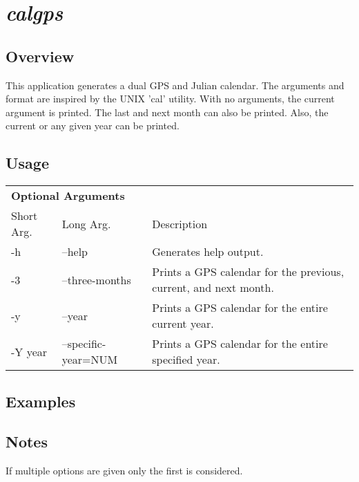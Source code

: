%
%

\section{\emph{calgps}}
\subsection{Overview}
This application generates a dual GPS and Julian calendar. The arguments and 
format are inspired by the UNIX 'cal' utility. With no arguments, the current 
argument is printed. The last and next month can also be printed. Also, the 
current or any given year can be printed.
\subsection{Usage}
\begin{\outputsize}
\begin{longtable}{lll}
\multicolumn{3}{l}{\textbf{Optional Arguments}} \\
Short Arg. & Long Arg. & Description \\
-h & --help & Generates help output. \\ 
-3 & --three-months & Prints a GPS calendar for the previous, current, and next month. \\
-y & --year & Prints a GPS calendar for the entire current year. \\
-Y year & --specific-year=NUM & Prints a GPS calendar for the entire specified year.
\end{longtable}
\end{\outputsize}

\subsection{Examples}



\subsection{Notes}
If multiple options are given only the first is considered.

%

